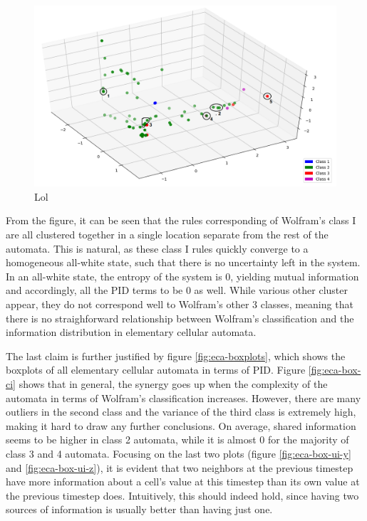 \documentclass[12pt]{article}
\begin{document}
\begin{figure} [h!]
\begin{center}
\includegraphics[width=\textwidth]{eca-pid-characterization}
\caption{Lol}
\label{fig:eca-pid-characterization}
\end{center}
\end{figure}

From the figure, it can be seen that the rules corresponding of Wolfram's class I are all clustered together in a single location separate from the rest of the automata. This is natural, as these class I rules quickly converge to a homogeneous all-white state, such that there is no uncertainty left in the system. In an all-white state, the entropy of the system is 0, yielding mutual information and accordingly, all the PID terms to be 0 as well. While various other cluster appear, they do not correspond well to Wolfram's other 3 classes, meaning that there is no straighforward relationship between Wolfram's classification and the information distribution in elementary cellular automata. 

The last claim is further justified by figure \ref{fig:eca-boxplots}, which shows the boxplots of all elementary cellular automata in terms of PID. Figure \ref{fig:eca-box-ci} shows that in general, the synergy goes up when the complexity of the automata in terms of Wolfram's classification increases. However, there are many outliers in the second class and the variance of the third class is extremely high, making it hard to draw any further conclusions. On average, shared information seems to be higher in class 2 automata, while it is almost 0 for the majority of class 3 and 4 automata. Focusing on the last two plots (figure \ref{fig:eca-box-ui-y} and \ref{fig:eca-box-ui-z}), it is evident that two neighbors at the previous timestep have more information about a cell's value at this timestep than its own value at the previous timestep does. Intuitively, this should indeed hold, since having two sources of information is usually better than having just one. 
\end{document}
